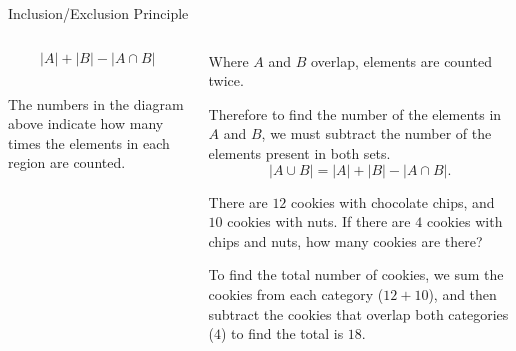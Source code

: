\documentclass[9pt,aspectratio=169]{beamer}
\begin{document}
\begin{frame}{Inclusion/Exclusion Principle}
\begin{columns}[T]
\begin{column}{0.5\textwidth}
\begin{columns}[totalwidth=0.8\textwidth]
\begin{column}{0.45\textwidth}
\begin{center}
            \[ |A| + |B| - |A \cap B| \]
          \end{center}
        \end{column}
      \end{columns}
      \vspace*{-0.5\baselineskip}
      The numbers in the diagram above indicate how many times the elements in each region are counted.
    \end{column}
    \begin{column}{0.5\textwidth}
      Where $A$ and $B$ overlap, elements are counted twice. 
      \begin{definition}
        Therefore to find the number of the elements in $A$ and $B$, we must subtract the number of the elements present in both sets. 
        \[ |A \cup B| = |A| + |B| - |A \cap B|. \]
        \vspace*{-0.9\baselineskip}
      \end{definition}
      \begin{problem}
        There are $12$ cookies with chocolate chips, and $10$ cookies with nuts.  If there are $4$ cookies with chips and nuts, how many cookies are there?
      \end{problem}
      To find the total number of cookies, we sum the cookies from each category ($12 + 10$), and then subtract the cookies that overlap both categories ($4$) to find the total is $18$.
    \end{column}
  \end{columns}
\end{frame}
\end{document}
